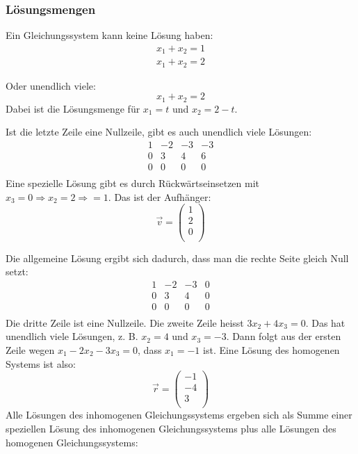\subsubsection{Lösungsmengen}
Ein Gleichungssystem kann keine Lösung haben:
\begin{align}
  x_1 + x_2 = 1 \\
  x_1 + x_2 = 2
\end{align}

Oder unendlich viele:
\[ x_1 + x_2 = 2 \] Dabei ist die Lösungsmenge für $x_1 = t$ und $x_2 =
2 - t$.

Ist die letzte Zeile eine Nullzeile, gibt es auch unendlich viele
Lösungen:
\[ \begin{array}{rrrr}
1  &   -2     & -3     & -3   \\
0   &   3     & 4     & 6   \\
0   &   0     & 0     & 0   \\
\end {array} \]
Eine spezielle Lösung gibt es durch Rückwärtseinsetzen mit $x_3 = 0
\Rightarrow x_2 = 2 \Rightarrow = 1$. Das ist der Aufhänger:
\[ \vec v = \left( \begin {array} {c} 1 \\ 2 \\ 0 \\ \end {array} \right) \]

Die allgemeine Lösung ergibt sich dadurch, dass man die rechte Seite
gleich Null setzt:
\[ \begin{array}{rrrr}
1  &   -2     & -3     & 0 \\
0   &   3     & 4     & 0 \\
0   &   0     & 0     & 0 \\
\end {array} \]
Die dritte Zeile ist eine Nullzeile. Die zweite Zeile heisst $3x_2 +
4x_3 = 0$. Das hat unendlich viele Lösungen, z. B. $x_2 = 4$ und $x_3 =
-3$. Dann folgt aus der ersten Zeile wegen $x_1 - 2x_2 - 3x_3 = 0$, dass
$x_1 = -1$ ist. Eine Lösung des homogenen Systems ist also:
\[ \vec r = \left( \begin {array} {c} -1 \\ -4 \\ 3 \\ \end {array} \right) \]
Alle Lösungen des inhomogenen Gleichungssystems ergeben sich als Summe
einer speziellen Lösung des inhomogenen Gleichungssystems plus alle
Lösungen des homogenen Gleichungssystems:


